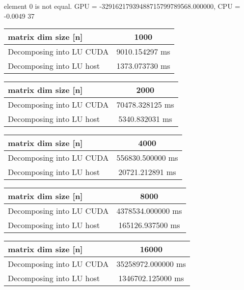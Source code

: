 element 0 is not equal. GPU = -32916217939488715799789568.000000, CPU = -0.0049
37


\begin{tabular}{|l|c|}
	\hline
	matrix dim size [n] & 1000 \\
	\hline
	Decomposing into LU CUDA & 9010.154297 ms\\
	\hline
	Decomposing into LU host &  1373.073730 ms\\	
	\hline
\end{tabular}



\begin{tabular}{|l|c|}
	\hline
	matrix dim size [n] & 2000 \\
	\hline
	Decomposing into LU CUDA & 70478.328125 ms\\
	\hline
	Decomposing into LU host & 5340.832031 ms\\	
	\hline
\end{tabular}


\begin{tabular}{|l|c|}
	\hline
	matrix dim size [n] & 4000 \\
	\hline
	Decomposing into LU CUDA & 556830.500000 ms\\
	\hline
	Decomposing into LU host & 20721.212891 ms\\	
	\hline
\end{tabular}


\begin{tabular}{|l|c|}
	\hline
	matrix dim size [n] & 8000 \\
	\hline
	Decomposing into LU CUDA & 4378534.000000 ms\\
	\hline
	Decomposing into LU host & 165126.937500 ms\\	
	\hline
\end{tabular}


\begin{tabular}{|l|c|}
	\hline
	matrix dim size [n] & 16000 \\
	\hline
	Decomposing into LU CUDA & 35258972.000000 ms\\
	\hline
	Decomposing into LU host & 1346702.125000 ms\\	
	\hline
\end{tabular}

